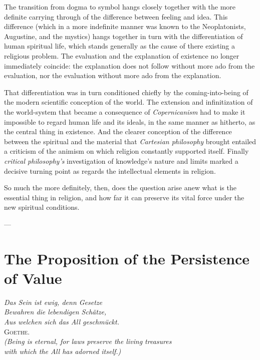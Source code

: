 \documentclass[12pt,a4paper]{book}
\newcommand{\opage}[1]{\marginnote{\footnotesize\textit{[#1]}}}
\begin{document}
The transition from dogma to symbol hangs closely together with the more definite carrying through of
the difference between feeling and idea. This difference (which in a more indefinite manner was known
to the Neoplatonists, Augustine, and the mystics) hangs together in turn with the differentiation of
human spiritual life, which stands generally as the cause of there existing a religious problem. The
evaluation and the explanation of existence no longer immediately coincide: the explanation does not
follow without more ado from the evaluation, nor the evaluation without more ado from the explanation.

That differentiation was in turn conditioned chiefly by the coming-into-being of the modern scientific
conception of the world. The extension and infinitization of the world-system that became a consequence
of \emph{Copernicanism} had to make it impossible to regard human life and its ideals, in the same
manner as hitherto, as the central thing in existence. And the clearer conception of the difference
between the spiritual and the material that \emph{Cartesian philosophy} brought entailed a criticism of
the animism on which religion constantly supported itself. Finally \emph{critical philosophy's}
investigation of knowledge's nature and limits marked a decisive turning point as regards the
intellectual elements in religion.

So much the more definitely, then, does the question arise anew what is the essential thing in religion,
and how far it can preserve its vital force under the new spiritual conditions.

\begin{center}---\end{center}

\section{The Proposition of the Persistence of Value}
\label{sec:persistence}

\begin{flushright}
\opage{145}
\textit{Das Sein ist ewig, denn Gesetze}\\
\textit{Bewahren die lebendigen Schätze,}\\
\textit{Aus welchen sich das All geschmückt.}\\[2pt]
\textsc{Goethe}.\\[4pt]
\textit{(Being is eternal, for laws preserve the living treasures}\\
\textit{with which the All has adorned itself.)}
\end{flushright}
\end{document}
